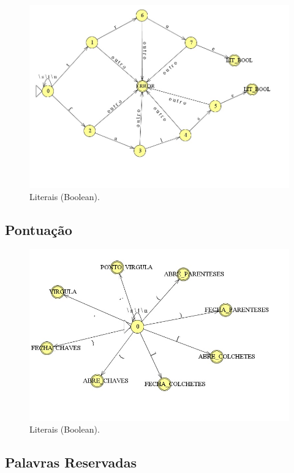 \documentclass{article}
\begin{document}
\begin{figure}[!h]
\centering
\includegraphics[width=12cm]{DT_LIT_BOOL.jpg}
\caption{Literais (Boolean).}
\label{fig:CL_logo}\end{figure}

\pagebreak

\subsection{Pontuação}

\begin{figure}[!h]
\centering
\includegraphics[width=12cm]{DT_Pontuacao.jpg}
\caption{Literais (Boolean).}
\label{fig:CL_logo}\end{figure}

\subsection{Palavras Reservadas}
\end{document}
